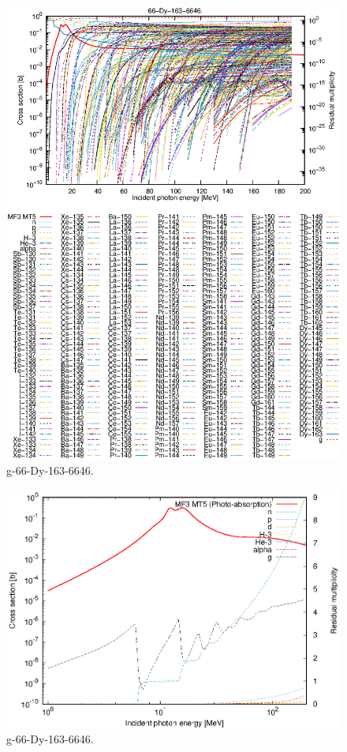 \begin{figure}
 \includegraphics[width=\linewidth]{eps/g_66-Dy-163_6646.eps}
  \caption{g-66-Dy-163-6646.}
\end{figure}
\newpage \clearpage

\begin{figure}
 \includegraphics[width=\linewidth]{eps-log/g_66-Dy-163_6646.eps}
 \caption{g-66-Dy-163-6646.}
\end{figure}
\newpage \clearpage

